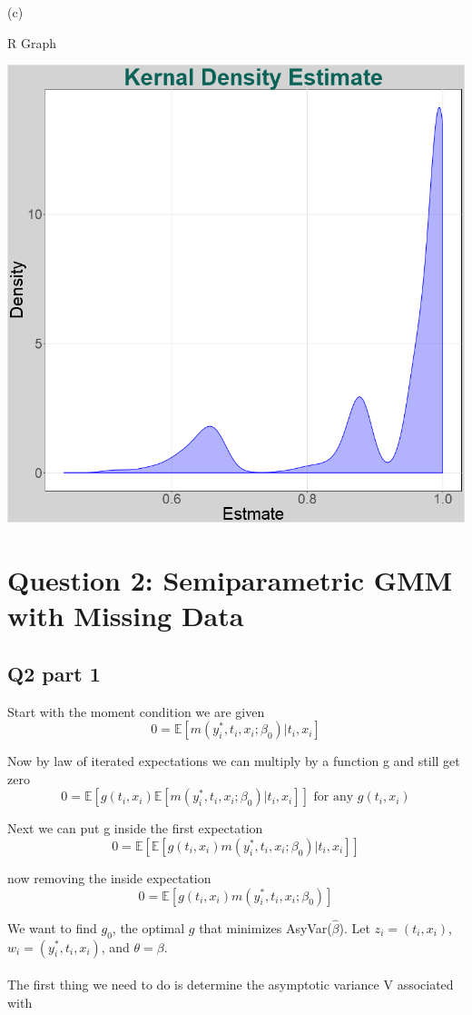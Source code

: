 \documentclass[11pt]{article}
\begin{document}
(c)
\centerline{R Graph }
\begin{center}
	\includegraphics[width=.8\linewidth]{plot_q1_9_c.png}
	
\end{center}



\section{Question 2: Semiparametric GMM with Missing Data}
\subsection{Q2 part 1}

Start with the moment condition we are given
$$
0 = \mathbb{E}[m(y_i^*, t_i, x_i; \beta_0)|t_i,x_i] $$

Now by law of iterated expectations we can multiply by a function g and still get zero
$$ 0 = \mathbb{E}[g(t_i, x_i)\mathbb{E}[m(y_i^*, t_i, x_i; \beta_0)|t_i, x_i]] \text{ for any } g(t_i, x_i) $$

Next we can put g inside the first expectation
$$ 0 = \mathbb{E}[\mathbb{E}[g(t_i, x_i)m(y_i^*, t_i, x_i; \beta_0)|t_i, x_i]] $$

now removing the inside expectation 
$$ 0 = \mathbb{E}[g(t_i, x_i)m(y_i^*, t_i, x_i; \beta_0)]$$

We want to find $g_0$, the optimal $g$ that minimizes AsyVar($\hat{\beta}$). Let $z_i=(t_i,x_i)$, $w_i = (y_i^*,t_i,x_i)$, and $\theta=\beta$.
\\ \\ 
The first thing we need to do is determine the asymptotic variance V associated with 
\end{document}
